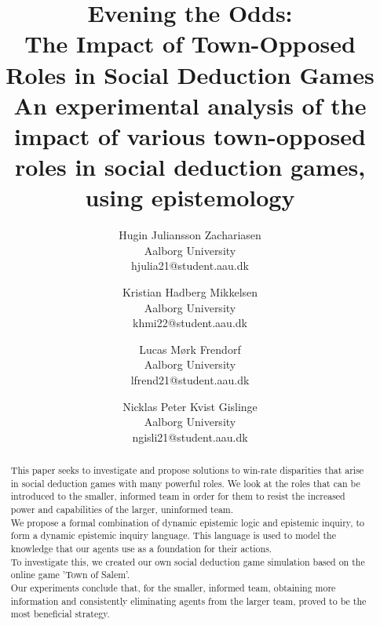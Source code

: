 \documentclass[twocolumn]{article}
\begin{document}

\title{Evening the Odds:\\ The Impact of Town-Opposed Roles in Social Deduction
	Games\\ \small An experimental analysis of the impact of various
	town-opposed roles in social deduction games, using epistemology}
\author{
	Hugin Juliansson Zachariasen \\ Aalborg University \\ hjulia21@student.aau.dk
	\and
	Kristian Hadberg Mikkelsen \\ Aalborg University \\ khmi22@student.aau.dk
	\and
	Lucas Mørk Frendorf \\ Aalborg University \\ lfrend21@student.aau.dk
	\and
	Nicklas Peter Kvist Gislinge \\ Aalborg University \\ ngisli21@student.aau.dk
}
\maketitle
\begin{abstract}
	This paper seeks to investigate and propose solutions to win-rate disparities that arise in social deduction games with many powerful roles. We look at the roles that can be introduced to the smaller, informed team in order for them to resist the increased power and capabilities of the larger, uninformed team.\\
	We propose a formal combination of dynamic epistemic logic and epistemic inquiry, to form a dynamic epistemic inquiry language. This language is used to model the knowledge that our agents use as a foundation for their actions.\\
	To investigate this, we created our own social
	deduction game simulation based on the online game
	'Town of Salem'\cite{TownOfSalem}.\\
	Our experiments conclude that, for the smaller, informed team, obtaining more information and consistently eliminating agents from the larger team, proved to be the most beneficial strategy.
\end{abstract}











\clearpage
\appendix
\makeatletter
\def\@seccntformat#1{\appendixname\ \csname the#1\endcsname: }
\makeatother




\clearpage
\printbibliography[heading=bibintoc, title=Bibliography]
\label{bib:mybiblio}
\end{document}
